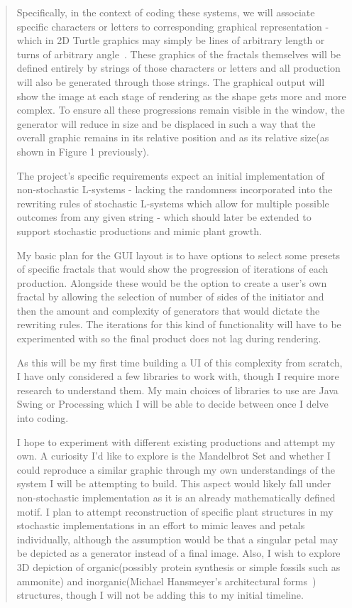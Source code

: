 \documentclass[]{plan}
\begin{document}
\begin{abstract}
Specifically, in the context of coding these systems, we will associate specific characters or letters to corresponding graphical representation - which in 2D Turtle graphics may simply be lines of arbitrary length or turns of arbitrary angle~\cite{MCL:2005}. These graphics of the fractals themselves will be defined entirely by strings of those characters or letters and all production will also be generated through those strings. The graphical output will show the image at each stage of rendering as the shape gets more and more complex. To ensure all these progressions remain visible in the window, the generator will reduce in size and be displaced in such a way that the overall graphic remains in its relative position and as its relative size(as shown in Figure 1 previously).

The project's specific requirements expect an initial implementation of non-stochastic L-systems - lacking the randomness incorporated into the rewriting rules of stochastic L-systems which allow for multiple possible outcomes from any given string - which should later be extended to support stochastic productions and mimic plant growth. 

My basic plan for the GUI layout is to have options to select some presets of specific fractals that would show the progression of iterations of each production. Alongside these would be the option to create a user's own fractal by allowing the selection of number of sides of the initiator and then the amount and complexity of generators that would dictate the rewriting rules. The iterations for this kind of functionality will have to be experimented with so the final product does not lag during rendering.

As this will be my first time building a UI of this complexity from scratch, I have only considered a few libraries to work with, though I require more research to understand them. My main choices of libraries to use are Java Swing or Processing which I will be able to decide between once I delve into coding.

I hope to experiment with different existing productions and attempt my own. A curiosity I'd like to explore is the Mandelbrot Set and whether I could reproduce a similar graphic through my own understandings of the system I will be attempting to build. This aspect would likely fall under non-stochastic implementation as it is an already mathematically defined motif. I plan to attempt reconstruction of specific plant structures in my stochastic implementations in an effort to mimic leaves and petals individually, although the assumption would be that a singular petal may be depicted as a generator instead of a final image. Also, I wish to explore 3D depiction of organic(possibly protein synthesis or simple fossils such as ammonite) and inorganic(Michael Hansmeyer's architectural forms~\cite{HANS:2003}) structures, though I will not be adding this to my initial timeline.

\end{abstract}
\newpage
\end{document}
